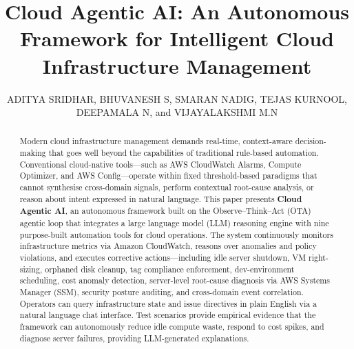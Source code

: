 \documentclass{ieeeaccess}
\begin{document}

\title{Cloud Agentic AI: An Autonomous Framework for Intelligent Cloud Infrastructure Management}

\author{
  \uppercase{Aditya Sridhar},
  \uppercase{Bhuvanesh S},
  \uppercase{Smaran Nadig},
  \uppercase{Tejas Kurnool},
  \uppercase{Deepamala N},
  and \uppercase{Vijayalakshmi M.N}
}

\address[1]{Department of Computer Science and Engineering, RV College of Engineering, Bengaluru, India}
\address[2]{Department of Artificial Intelligence and Machine Learning, RV College of Engineering, Bengaluru, India}
\address[3]{Professor, Department of Computer Science and Engineering, RV College of Engineering, Bengaluru, India}
\address[4]{Associate Professor, Department of Artificial Intelligence and Machine Learning, RV College of Engineering, Bengaluru, India}




\begin{abstract}
Modern cloud infrastructure management demands real-time, context-aware
decision-making that goes well beyond the capabilities of traditional
rule-based automation. Conventional cloud-native tools---such as AWS
CloudWatch Alarms, Compute Optimizer, and AWS Config---operate within fixed
threshold-based paradigms that cannot synthesise cross-domain signals,
perform contextual root-cause analysis, or reason about intent expressed in
natural language. This paper presents \textbf{Cloud Agentic AI}, an
autonomous framework built on the Observe--Think--Act (OTA) agentic loop
that integrates a large language model (LLM) reasoning engine with nine
purpose-built automation tools for cloud operations. The system continuously
monitors infrastructure metrics via Amazon CloudWatch, reasons over
anomalies and policy violations, and executes corrective actions---including
idle server shutdown, VM right-sizing, orphaned disk cleanup, tag compliance
enforcement, dev-environment scheduling, cost anomaly detection, server-level
root-cause diagnosis via AWS Systems Manager (SSM), security posture
auditing, and cross-domain event correlation. Operators can query infrastructure state and issue directives in plain English via a natural language chat interface. Test scenarios provide empirical evidence that the framework can autonomously reduce idle compute waste, respond to cost spikes, and diagnose server failures, providing LLM-generated explanations.
\end{abstract}
\end{document}
